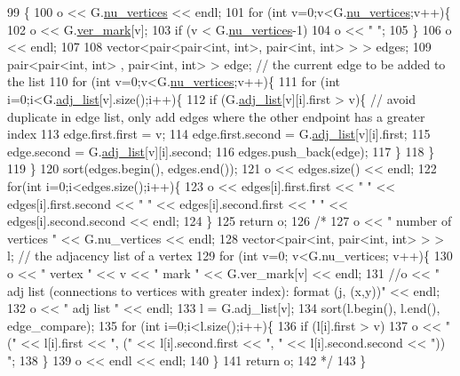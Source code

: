 \begin{DoxyCode}
99 \{
100   o << G.\hyperlink{classmarked__graph_acf79c6aeb8f32614cb14a5baaa6c9f9b}{nu\_vertices} << endl;
101   \textcolor{keywordflow}{for} (\textcolor{keywordtype}{int} v=0;v<G.\hyperlink{classmarked__graph_acf79c6aeb8f32614cb14a5baaa6c9f9b}{nu\_vertices};v++)\{
102     o << G.\hyperlink{classmarked__graph_ac83e9377dd4d8bb95be1ac949b127296}{ver\_mark}[v];
103     \textcolor{keywordflow}{if} (v < G.\hyperlink{classmarked__graph_acf79c6aeb8f32614cb14a5baaa6c9f9b}{nu\_vertices}-1)
104       o << \textcolor{stringliteral}{" "};
105   \}
106   o << endl;
107 
108   vector<pair<pair<int, int>, pair<int, int> > > edges;
109   pair<pair<int, int> , pair<int, int> > edge; \textcolor{comment}{// the current edge to be added to the list}
110   \textcolor{keywordflow}{for} (\textcolor{keywordtype}{int} v=0;v<G.\hyperlink{classmarked__graph_acf79c6aeb8f32614cb14a5baaa6c9f9b}{nu\_vertices};v++)\{
111     \textcolor{keywordflow}{for} (\textcolor{keywordtype}{int} i=0;i<G.\hyperlink{classmarked__graph_a1a0bf7ca413a278763f7c878b3b6fd6f}{adj\_list}[v].size();i++)\{
112       \textcolor{keywordflow}{if} (G.\hyperlink{classmarked__graph_a1a0bf7ca413a278763f7c878b3b6fd6f}{adj\_list}[v][i].first > v)\{ \textcolor{comment}{// avoid duplicate in edge list, only add edges where the
       other endpoint has a greater index}
113         edge.first.first = v;
114         edge.first.second = G.\hyperlink{classmarked__graph_a1a0bf7ca413a278763f7c878b3b6fd6f}{adj\_list}[v][i].first;
115         edge.second = G.\hyperlink{classmarked__graph_a1a0bf7ca413a278763f7c878b3b6fd6f}{adj\_list}[v][i].second;
116         edges.push\_back(edge);
117       \}
118     \}
119   \}
120   sort(edges.begin(), edges.end());
121   o << edges.size() << endl;
122   \textcolor{keywordflow}{for}(\textcolor{keywordtype}{int} i=0;i<edges.size();i++)\{
123     o << edges[i].first.first << \textcolor{stringliteral}{" "} << edges[i].first.second << \textcolor{stringliteral}{" "} << edges[i].second.first << \textcolor{stringliteral}{" "} << 
      edges[i].second.second << endl;
124   \}
125   \textcolor{keywordflow}{return} o;
126   \textcolor{comment}{/*}
127 \textcolor{comment}{  o << " number of vertices " << G.nu\_vertices << endl;}
128 \textcolor{comment}{  vector<pair<int, pair<int, int> > > l; // the adjacency list of a vertex}
129 \textcolor{comment}{  for (int v=0; v<G.nu\_vertices; v++)\{}
130 \textcolor{comment}{    o << " vertex " << v << " mark " << G.ver\_mark[v] << endl;}
131 \textcolor{comment}{    //o << " adj list (connections to vertices with greater index): format (j, (x,y))" << endl;}
132 \textcolor{comment}{    o << " adj list " << endl;}
133 \textcolor{comment}{    l = G.adj\_list[v];}
134 \textcolor{comment}{    sort(l.begin(), l.end(), edge\_compare);}
135 \textcolor{comment}{    for (int i=0;i<l.size();i++)\{}
136 \textcolor{comment}{      if (l[i].first > v)}
137 \textcolor{comment}{        o << " (" << l[i].first << ", (" << l[i].second.first << ", " << l[i].second.second << ")) ";}
138 \textcolor{comment}{    \}}
139 \textcolor{comment}{    o << endl << endl;}
140 \textcolor{comment}{  \}}
141 \textcolor{comment}{  return o;}
142 \textcolor{comment}{  */}
143 \}
\end{DoxyCode}
